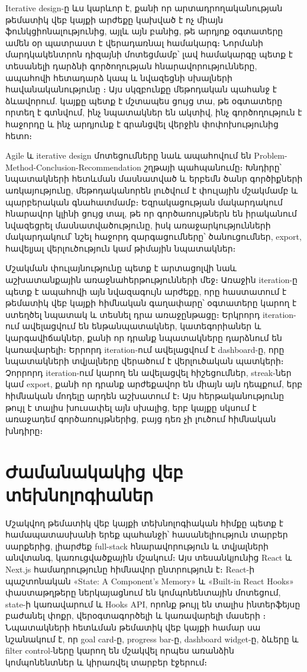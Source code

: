 Iterative design-ը ևս կարևոր է, քանի որ արտադրողականության թեմատիկ վեբ կայքի արժեքը կախված է ոչ միայն ֆունկցիոնալությունից, այլև այն բանից, թե արդյոք օգտատերը ամեն օր պատրաստ է վերադառնալ համակարգ։ Նորմանի մարդկակենտրոն դիզայնի մոտեցմամբ՝ լավ համակարգը պետք է տեսանելի դարձնի գործողության հնարավորությունները, ապահովի հետադարձ կապ և նվազեցնի սխալների հավանականությունը \autocite{norman2013design}։ Այս սկզբունքը մեթոդական պահանջ է ձևավորում. կայքը պետք է մշտապես ցույց տա, թե օգտատերը որտեղ է գտնվում, ինչ նպատակներ են ակտիվ, ինչ գործողություն է հաջորդը և ինչ արդյունք է գրանցվել վերջին փոփոխությունից հետո։

Agile և iterative design մոտեցումները նաև ապահովում են Problem-Method-Conclusion-Recommendation շղթայի պահպանումը։ Խնդիրը՝ նպատակների հետևման մասնատված և երբեմն ծանր գործիքների առկայությունը, մեթոդականորեն լուծվում է փուլային մշակմամբ և պարբերական գնահատմամբ։ Եզրակացության մակարդակում հնարավոր կլինի ցույց տալ, թե որ գործառույթներն են իրականում նվազեցրել մասնատվածությունը, իսկ առաջարկությունների մակարդակում՝ նշել հաջորդ զարգացումները՝ ծանուցումներ, export, հավելյալ վերլուծություն կամ թիմային նպատակներ։

Մշակման փուլայնությունը պետք է արտացոլվի նաև աշխատանքային առաջնահերթությունների մեջ։ Առաջին iteration-ը պետք է ապահովի այն նվազագույն արժեքը, որը հաստատում է թեմատիկ վեբ կայքի հիմնական գաղափարը՝ օգտատերը կարող է ստեղծել նպատակ և տեսնել դրա առաջընթացը։ Երկրորդ iteration-ում ավելացվում են ենթանպատակներ, կատեգորիաներ և կարգավիճակներ, քանի որ դրանք նպատակները դարձնում են կառավարելի։ Երրորդ iteration-ում ավելացվում է dashboard-ը, որը նպատակների տվյալները վերածում է վերլուծական պատկերի։ Չորրորդ iteration-ում կարող են ավելացվել հիշեցումներ, streak-ներ կամ export, քանի որ դրանք արժեքավոր են միայն այն դեպքում, երբ հիմնական մոդելը արդեն աշխատում է։ Այս հերթականությունը թույլ է տալիս խուսափել այն սխալից, երբ կայքը սկսում է առաջադեմ գործառույթներից, բայց դեռ չի լուծում հիմնական խնդիրը։

\section{Ժամանակակից վեբ տեխնոլոգիաներ}

Մշակվող թեմատիկ վեբ կայքի տեխնոլոգիական հիմքը պետք է համապատասխանի երեք պահանջի՝ հասանելիություն տարբեր սարքերից, լիարժեք full-stack հնարավորություն և տվյալների անվտանգ, կառուցվածքային մշակում։ Այս տեսանկյունից React և Next.js համադրությունը հիմնավոր ընտրություն է։ React-ի պաշտոնական «State: A Component's Memory» և «Built-in React Hooks» փաստաթղթերը ներկայացնում են կոմպոնենտային մոտեցում, state-ի կառավարում և Hooks API, որոնք թույլ են տալիս ինտերֆեյսը բաժանել փոքր, վերօգտագործելի և կառավարելի մասերի \autocite{reactDocsState,reactDocsHooks}։ Նպատակների հետևման թեմատիկ վեբ կայքի համար սա նշանակում է, որ goal card-ը, progress bar-ը, dashboard widget-ը, ձևերը և filter control-ները կարող են մշակվել որպես առանձին կոմպոնենտներ և կիրառվել տարբեր էջերում։

